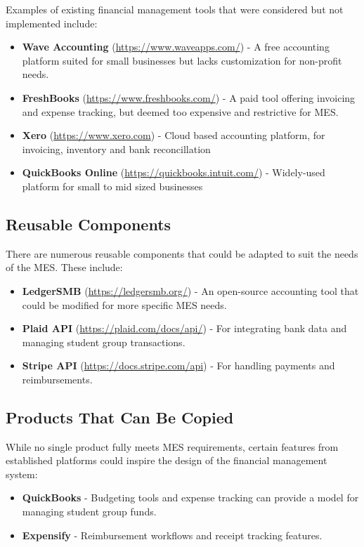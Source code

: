 \documentclass[12pt]{article}
\begin{document}
Examples of existing financial management tools that were considered but not implemented include:
\begin{itemize}
    \item \textbf{Wave Accounting} (\href{https://www.waveapps.com/}{https://www.waveapps.com/}) - A free accounting platform suited for small businesses but lacks customization for non-profit needs.
    \item \textbf{FreshBooks} (\href{https://www.freshbooks.com/}{https://www.freshbooks.com/}) - A paid tool offering invoicing and expense tracking, but deemed too expensive and restrictive for MES.
    \item \textbf{Xero} (\href{https://www.xero.com}{https://www.xero.com}) - Cloud based accounting platform, for invoicing, inventory and bank reconcillation
    \item \textbf{QuickBooks Online} (\href{https://quickbooks.intuit.com/}{https://quickbooks.intuit.com/}) - Widely-used platform for small to mid sized businesses

\end{itemize}
\subsection{Reusable Components}
There are numerous reusable components that could be adapted to suit the needs of the MES. These include:
\begin{itemize}
    \item \textbf{LedgerSMB} (\href{https://ledgersmb.org/}{https://ledgersmb.org/}) - An open-source accounting tool that could be modified for more specific MES needs.
    \item \textbf{Plaid API} (\href{https://plaid.com/docs/api/}{https://plaid.com/docs/api/}) - For integrating bank data and managing student group transactions.
    \item \textbf{Stripe API} (\href{https://docs.stripe.com/api}{https://docs.stripe.com/api}) - For handling payments and reimbursements.
\end{itemize}

\subsection{Products That Can Be Copied}
While no single product fully meets MES requirements, certain features from established platforms could inspire the design of the financial management system:
\begin{itemize}
    \item \textbf{QuickBooks} - Budgeting tools and expense tracking can provide a model for managing student group funds.
    \item \textbf{Expensify} - Reimbursement workflows and receipt tracking features.
\end{itemize}
\end{document}
